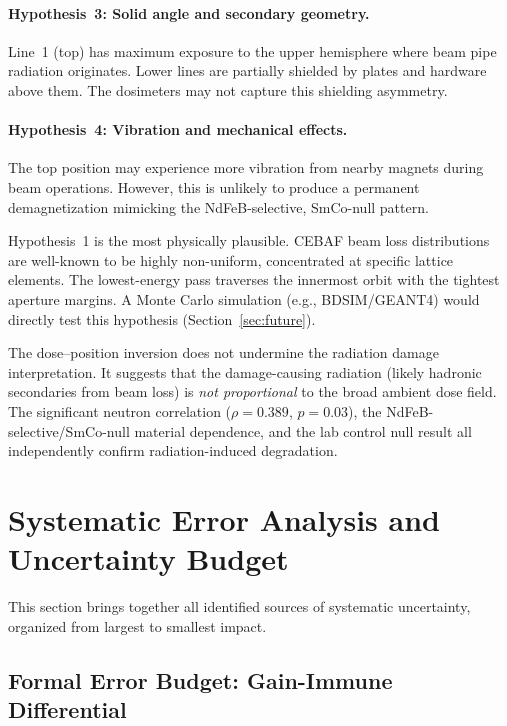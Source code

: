 \documentclass[11pt,letterpaper]{article}
\newcommand{\CEBAF}{CEBAF}
\begin{document}
\paragraph{Hypothesis~3: Solid angle and secondary geometry.}
Line~1 (top) has maximum exposure to the upper hemisphere where beam pipe
radiation originates. Lower lines are partially shielded by plates and
hardware above them. The dosimeters may not capture this shielding asymmetry.

\paragraph{Hypothesis~4: Vibration and mechanical effects.}
The top position may experience more vibration from nearby magnets during
beam operations. However, this is unlikely to produce a permanent
demagnetization mimicking the NdFeB-selective, SmCo-null pattern.

Hypothesis~1 is the most physically plausible. \CEBAF
beam loss distributions are well-known to be highly non-uniform, concentrated
at specific lattice elements. The lowest-energy pass traverses the innermost
orbit with the tightest aperture margins. A Monte Carlo simulation (e.g.,
BDSIM/GEANT4) would directly test this hypothesis (Section~\ref{sec:future}).

The dose--position inversion does not undermine the
radiation damage interpretation. It suggests that the damage-causing radiation
(likely hadronic secondaries from beam loss) is \emph{not proportional} to the
broad ambient dose field. The significant neutron correlation ($\rho = 0.389$,
$p = 0.03$), the NdFeB-selective/SmCo-null material dependence, and the lab
control null result all independently confirm radiation-induced degradation.

\section{Systematic Error Analysis and Uncertainty Budget}
\label{sec:systematics}

This section brings together all identified sources of systematic uncertainty,
organized from largest to smallest impact.

\subsection{Formal Error Budget: Gain-Immune Differential}
\end{document}
